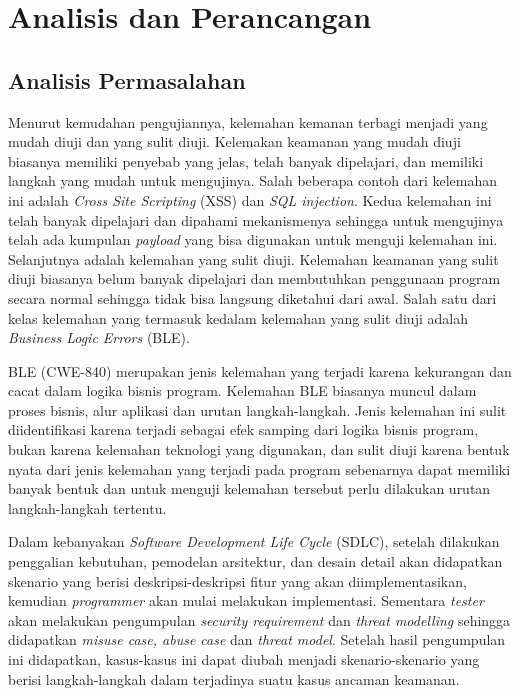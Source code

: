 \chapter{Analisis dan Perancangan}

\section{Analisis Permasalahan}

Menurut kemudahan pengujiannya, kelemahan kemanan terbagi menjadi yang mudah diuji
dan yang sulit diuji. Kelemakan keamanan yang mudah diuji biasanya memiliki penyebab
yang jelas, telah banyak dipelajari, dan memiliki langkah yang mudah untuk mengujinya.
Salah beberapa contoh dari kelemahan ini adalah \emph{Cross Site Scripting} (XSS) dan
\emph{SQL injection}. Kedua kelemahan ini telah banyak dipelajari dan dipahami mekanismenya
sehingga untuk mengujinya telah ada kumpulan \emph{payload} yang bisa digunakan untuk menguji
kelemahan ini. Selanjutnya adalah kelemahan yang sulit diuji. Kelemahan keamanan
yang sulit diuji biasanya belum banyak dipelajari dan membutuhkan penggunaan program
secara normal sehingga tidak bisa langsung diketahui dari awal. Salah satu
dari kelas kelemahan yang termasuk kedalam kelemahan yang sulit diuji adalah
\emph{Business Logic Errors} (BLE).

BLE (CWE-840) merupakan jenis kelemahan yang terjadi karena kekurangan
dan cacat dalam logika bisnis program. Kelemahan BLE biasanya muncul dalam proses bisnis,
alur aplikasi dan urutan langkah-langkah. Jenis kelemahan ini sulit diidentifikasi karena
terjadi sebagai efek samping dari logika bisnis program, bukan karena kelemahan teknologi
yang digunakan, dan sulit diuji karena bentuk nyata dari jenis kelemahan yang terjadi
pada program sebenarnya dapat memiliki banyak bentuk dan untuk menguji kelemahan tersebut
perlu dilakukan urutan langkah-langkah tertentu.

Dalam kebanyakan \textit{Software Development Life Cycle} (SDLC), setelah dilakukan
penggalian kebutuhan, pemodelan arsitektur, dan desain detail akan didapatkan
skenario yang berisi deskripsi-deskripsi fitur yang akan diimplementasikan,
kemudian \emph{programmer} akan mulai melakukan implementasi.
Sementara \emph{tester} akan melakukan
pengumpulan \emph{security requirement} dan \emph{threat modelling} sehingga didapatkan
\emph{misuse case, abuse case} dan \emph{threat model}. Setelah hasil pengumpulan ini
didapatkan, kasus-kasus ini dapat diubah menjadi skenario-skenario yang berisi
langkah-langkah dalam terjadinya suatu kasus ancaman keamanan.

